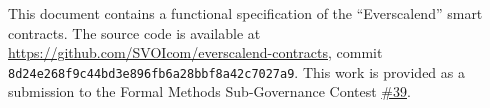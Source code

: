 
This document contains a functional specification of the ``Everscalend'' smart contracts. The source code is available at \url{https://github.com/SVOIcom/everscalend-contracts}, commit \\\verb+8d24e268f9c44bd3e896fb6a28bbf8a42c7027a9+. This work is provided as a submission to the Formal Methods Sub-Governance Contest \href{https://formet.gov.freeton.org/proposal?proposalAddress=0\%3A222afd84a41bb8c70517d692d0a4a28c42898b1d3520279a86878202f5730a0f}{\#39}.
